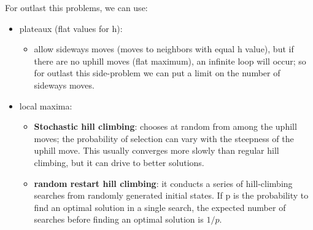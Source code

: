 \documentclass[12pt]{article}
\begin{document}
\begin{enumerate}[label=\textbf{II.\arabic*}]
    For outlast this problems, we can use:
    \begin{itemize}
        \item plateaux (flat values for h):
        \begin{itemize}
            \item allow sideways moves (moves to neighbors with equal h value), but if there are no uphill moves (flat maximum), 
            an infinite loop will occur; so for outlast this side-problem we can put a limit on the number of sideways moves.
        \end{itemize}
        \item local maxima:
        \begin{itemize}
            \item \textbf{Stochastic hill climbing}: chooses at random from among the uphill moves; the probability of selection can vary with the steepness of the uphill move.
            This usually converges more slowly than regular hill climbing, but it can drive to better solutions.
            \item \textbf{random restart hill climbing}: 
            it conducts a series of hill-climbing searches from randomly generated initial states.
            If p is the probability to find an optimal solution in a single search, the expected number of searches before finding an optimal solution is $1/p$.
            

\end{itemize}
\end{itemize}
\end{enumerate}
\end{document}

